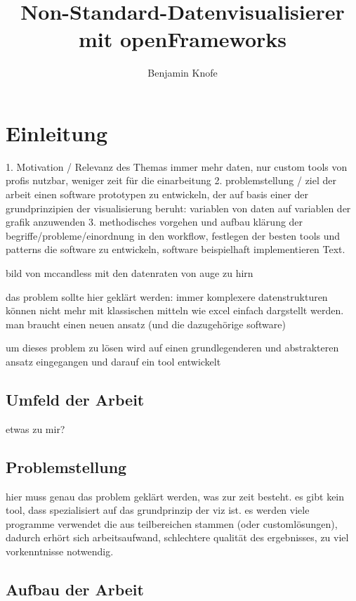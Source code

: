 \documentclass[a4paper, 12pt, onepage, pdftex, headsepline, footsepline]{scrreprt}
\begin{document}
\title{Non-Standard-Datenvisualisierer mit openFrameworks}
\author{Benjamin Knofe}
\subject{Diplomarbeit}
\publishers{Hochschule für Technik, Wirtschaft und Kultur Leipzig}
\dedication{viele nette Leute}
\maketitle
\tableofcontents
\chapter{Einleitung}
\label{sec:testi}

1. Motivation / Relevanz des Themas
immer mehr daten, nur custom tools von profis nutzbar, weniger zeit für die einarbeitung
2. problemstellung / ziel der arbeit
einen software prototypen zu entwickeln, der auf basis einer der grundprinzipien der visualisierung beruht: variablen von daten auf variablen der grafik anzuwenden
3. methodisches vorgehen und aufbau
klärung der begriffe/probleme/einordnung in den workflow, festlegen der besten tools und patterns die software zu entwickeln, software beispielhaft implementieren Text.

bild von mccandless mit den datenraten von auge zu hirn

das problem sollte hier geklärt werden:
immer komplexere datenstrukturen können nicht mehr mit klassischen mitteln wie excel einfach dargstellt werden. man braucht einen neuen ansatz (und die dazugehörige software)

um dieses problem zu lösen wird auf einen grundlegenderen und abstrakteren ansatz eingegangen und darauf ein tool entwickelt
\section{Umfeld der Arbeit}
etwas zu mir?
\section{Problemstellung}
hier muss genau das problem geklärt werden, was zur zeit besteht.
es gibt kein tool, dass spezialisiert auf das grundprinzip der viz ist.
es werden viele programme verwendet die aus teilbereichen stammen (oder customlösungen), dadurch erhört sich arbeitsaufwand, schlechtere qualität des ergebnisses, zu viel vorkenntnisse notwendig.
\section{Aufbau der Arbeit}
\end{document}
